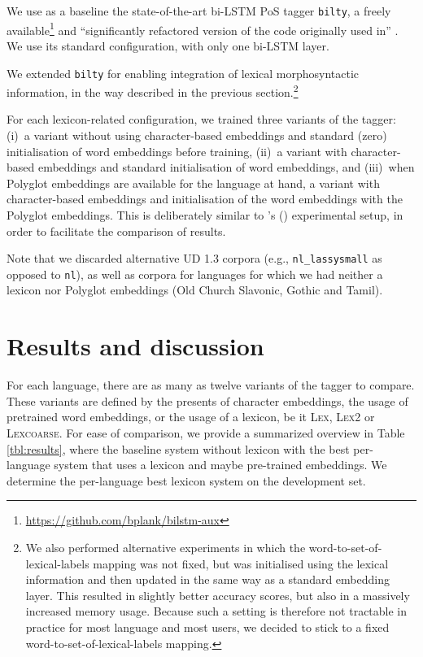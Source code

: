 \documentclass[11pt,letterpaper]{article}
\begin{document}
We use as a baseline the state-of-the-art bi-LSTM PoS tagger \texttt{bilty}, a freely
available\footnote{\url{https://github.com/bplank/bilstm-aux}} and ``significantly refactored version of the code
originally used in'' \cite{plank16}. We use its standard configuration, with only one bi-LSTM layer.

We extended \texttt{bilty} for enabling integration of lexical morphosyntactic information, in the way described in the
previous section.\footnote{We also performed alternative experiments in which the word-to-set-of-lexical-labels mapping
  was not fixed, but was initialised using the lexical information and then updated in the same way as a standard
  embedding layer. This resulted in slightly better accuracy scores, but also in a massively increased memory
  usage. Because such a setting is therefore not tractable in practice for most language and most users, we decided to
  stick to a fixed word-to-set-of-lexical-labels mapping.}

For each lexicon-related configuration, we trained three variants of the tagger: (i)~a variant without using
character-based embeddings and standard (zero) initialisation of word embeddings before training, (ii)~a variant with
character-based embeddings and standard initialisation of word embeddings, and (iii)~when Polyglot embeddings are
available for the language at hand, a variant with character-based embeddings and initialisation of the word embeddings
with the Polyglot embeddings. This is deliberately similar to \citeauthor{plank16}'s (\citeyear{plank16}) experimental
setup, in order to facilitate the comparison of results.

Note that we discarded alternative UD 1.3 corpora (e.g., {\tt nl\_lassysmall} as opposed to {\tt nl}), as well as
corpora for languages for which we had neither a lexicon nor Polyglot embeddings (Old Church Slavonic, Gothic and Tamil).


\section{Results and discussion}

For each language, there are as many as twelve variants of the tagger to compare. These variants are defined by the presents of character embeddings, the usage of pretrained word embeddings, or the usage of a lexicon, be it \textsc{Lex}, \textsc{Lex2} or \textsc{Lexcoarse}. For ease of comparison, we provide a summarized overview in Table \ref{tbl:results}, where the baseline system without lexicon with the best per-language system that uses a lexicon and maybe pre-trained embeddings. We determine the per-language best lexicon system on the development set.
\end{document}
